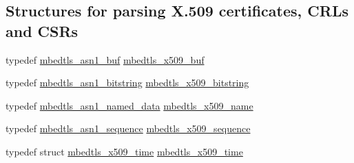 \subsection*{Structures for parsing X.509 certificates, C\+R\+Ls and C\+S\+Rs}
\begin{DoxyCompactItemize}
\item 
typedef \mbox{\hyperlink{structmbedtls__asn1__buf}{mbedtls\+\_\+asn1\+\_\+buf}} \mbox{\hyperlink{group__x509__module_ga4d02c9e8e4e2934555e0d132cd2976dc}{mbedtls\+\_\+x509\+\_\+buf}}
\item 
typedef \mbox{\hyperlink{structmbedtls__asn1__bitstring}{mbedtls\+\_\+asn1\+\_\+bitstring}} \mbox{\hyperlink{group__x509__module_gaf25a97602f25027e160f22f6d5590636}{mbedtls\+\_\+x509\+\_\+bitstring}}
\item 
typedef \mbox{\hyperlink{structmbedtls__asn1__named__data}{mbedtls\+\_\+asn1\+\_\+named\+\_\+data}} \mbox{\hyperlink{group__x509__module_ga2272228c7776102328df31623af3168c}{mbedtls\+\_\+x509\+\_\+name}}
\item 
typedef \mbox{\hyperlink{structmbedtls__asn1__sequence}{mbedtls\+\_\+asn1\+\_\+sequence}} \mbox{\hyperlink{group__x509__module_gabd52d60a09315854d9ef849d02154f35}{mbedtls\+\_\+x509\+\_\+sequence}}
\item 
typedef struct \mbox{\hyperlink{structmbedtls__x509__time}{mbedtls\+\_\+x509\+\_\+time}} \mbox{\hyperlink{group__x509__module_ga38827540a02fb2ddca08ec0917a8a41b}{mbedtls\+\_\+x509\+\_\+time}}
\end{DoxyCompactItemize}
